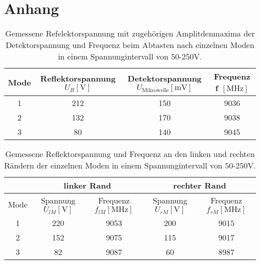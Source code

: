 \section{Anhang}

\begin{table}
    \centering
    \caption{Gemessene Refelektorspannung mit zugehörigen Amplitdenmaxima der Detektorspannung und Frequenz beim Abtasten nach einzelnen Moden in einem Spannungintervall von $50$-$250 \si{\volt}$.} 
    \label{tab:Messreihe11}
    \begin{tabular}{c | c c c}
        \toprule
        Mode & Reflektorspannung $U_{R} [\si{\volt}] $ & Detektorspannung $ U_{\text{Mikrowelle}} [\si{\milli\volt}] $ & Frequenz f $[\si{\mega\hertz}]$ \\
        \midrule
        1      &      212         &       150              &        9036 \\
        2      &      132         &       170              &        9038 \\
        3      &      80          &       140              &        9045 \\
    \end{tabular}
\end{table}
 
\begin{table}
    \centering
    \caption{Gemessene Reflektorspannung und Frequenz an den linken und rechten Rändern der einzelnen Moden in einem Spannungintervall von $50$-$250 \si{\volt}$.}
    \label{tab:Messreihe12}
    \begin{tabular}{c | c c | c c}
        \midrule
        ~ &  \multicolumn{2}{c}{linker Rand} & \multicolumn{2}{c}{rechter Rand} \\
        \toprule
        Mode & Spannung $U_{lM} [\si{\volt}] $ & Frequenz $f_{lM}[\si{\mega\hertz}]$ & Spannung $U_{rM} [\si{\volt}] $ & Frequenz $f_{rM}[\si{\mega\hertz}]$ \\
        \midrule
        1     &     220         &            9053            &                200          &              9015      \\
        2      &    152         &            9075            &                115          &              9017      \\
        3       &   82          &            9087            &                60           &              8987      \\
    \end{tabular}
\end{table}

